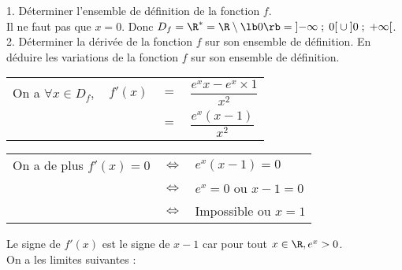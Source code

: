 \vspace*{.3cm}

1. Déterminer l'ensemble de définition de la fonction $f$. \\

Il ne faut pas que $x = 0$. Donc $D_f = \R^* = \R \setminus \lb 0 \rb = \left]-\infty \; ; \; 0\right[ \cup \left] 0 \; ; \; +\infty\right[$. \\

2. Déterminer la dérivée de la fonction $f$ sur son ensemble de définition. En déduire les variations de la fonction $f$ sur son ensemble de définition. \\

\begin{tabular}{llll}
\hspace{-.3cm }On a $\forall x \in D_f,$ & $ f'(x)$ & $=$ & $\dfrac{e^xx-e^x \times 1}{x^2}$ \vspace*{.3cm} \\
& & $=$ & $\dfrac{e^x\left(x-1\right)}{x^2}$ \\
\end{tabular}

\vspace*{.3cm}

\begin{tabular}{lll}
\hspace{-.3cm}On a de plus $f'(x) = 0$ & $\Longleftrightarrow$ & $e^x\left(x-1\right) = 0$ \vspace*{.3cm} \\
& $\Longleftrightarrow$ & $e^x = 0$ ou $x-1 = 0$ \vspace*{.3cm} \\
& $\Longleftrightarrow$ & Impossible ou $x = 1$ \\
\end{tabular}

\vspace*{.3cm}

Le signe de $f'(x)$ est le signe de $x-1$ car pour tout $x \in \R, e^x > 0$. \\

On a les limites suivantes : \\

